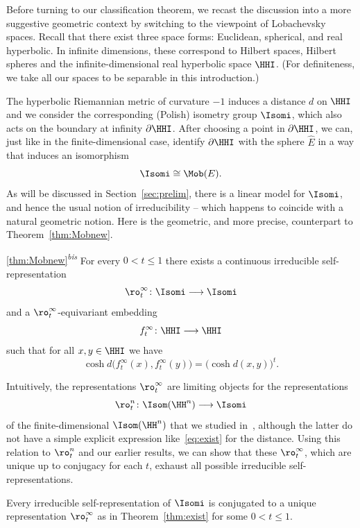 Before turning to our classification theorem, we recast the discussion into a more suggestive geometric context by switching to the viewpoint of Lobachevsky spaces. Recall that there exist three space forms: Euclidean, spherical, and real hyperbolic. In infinite dimensions, these correspond to Hilbert spaces, Hilbert spheres and the infinite-dimensional real hyperbolic space $\HHI$. (For definiteness, we take all our spaces to be separable in this introduction.)

The hyperbolic Riemannian metric of curvature $-1$ induces a distance $d$ on $\HHI$ and we consider the corresponding (Polish) isometry group $\Isomi$, which also acts on the boundary at infinity $\partial \HHI$. After choosing a point in $\partial \HHI$, we can, just like in the finite-dimensional case, identify $\partial \HHI$ with the sphere $\widehat E$ in a way that induces an isomorphism
\[
\Isomi\cong \Mob(E).
\]
As will be discussed in Section~\ref{sec:prelim}, there is a linear model for $\Isomi$, and hence the usual notion of irreducibility -- which happens to coincide with a natural geometric notion. Here is the geometric, and more precise, counterpart to Theorem~\ref{thm:Mobnew}.

\begin{customthm}{\ref{thm:Mobnew}\textsuperscript{\textit{bis}}}\label{thm:exist}
For every $0<t\leq 1$ there exists a continuous irreducible self-representation
\[
\ro^\infty_t\colon \Isomi\longrightarrow \Isomi
\]
and a $\ro^\infty_t$-equivariant embedding
\[
f^\infty_t\colon \HHI \longrightarrow \HHI
\]
such that for all $x,y \in \HHI$ we have
\begin{equation}\label{eq:exist}
\cosh d\big(f^\infty_t(x), f^\infty_t(y)\big) = \big(\cosh d(x, y)\big)^t.
\end{equation}
\end{customthm}

Intuitively, the representations $\ro^\infty_t$ are limiting objects for the representations
\[
\ro^n_t\colon \Isom(\HH^n)\longrightarrow \Isomi
\]
of the finite-dimensional $\Isom(\HH^n)$ that we studied in~\cite{Monod-Py}, although the latter do not have a simple explicit expression like~\eqref{eq:exist} for the distance. Using this relation to $\ro^n_t$ and our earlier results, we can show that these $\ro^\infty_t$, which are unique up to conjugacy for each $t$, exhaust all possible irreducible self-representations.

\begin{imain}\label{thm:uniqueness}
Every irreducible self-representation of $\Isomi$ is conjugated to a unique representation $\ro^\infty_t$ as in Theorem~\ref{thm:exist} for some $0<t\leq 1$.
\end{imain}

